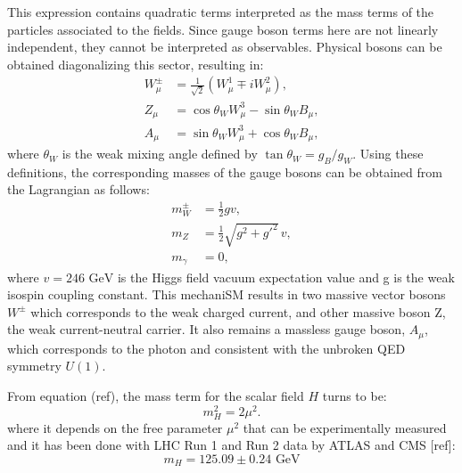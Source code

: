\documentclass[11pt,twoside]{book}
\begin{document}
This expression contains quadratic terms interpreted as the mass terms of the particles associated to the fields. Since gauge boson terms here are not linearly independent, they cannot be interpreted as observables. Physical bosons can be obtained diagonalizing this sector, resulting in:
\begin{align}
W^\pm_\mu &= \frac{1}{\sqrt{2}} \left( W^1_\mu \mp i W^2_\mu \right), \\
Z_\mu &= \cos\theta_W W^3_\mu - \sin\theta_W B_\mu, \\
A_\mu &= \sin\theta_W W^3_\mu + \cos\theta_W B_\mu,
\end{align}
where $\theta_W$ is the weak mixing angle defined by $\tan \theta_W = g_B /g_W$.
Using these definitions, the corresponding masses of the gauge bosons can be obtained from the Lagrangian as follows:
\begin{align}
m^{\pm}_W &= \frac{1}{2} g v, \\
m_Z &= \frac{1}{2} \sqrt{g^2 + g'^2} \, v, \\
m_\gamma &= 0,
\end{align}
where $v = 246 \text{  GeV}$ is the Higgs field vacuum expectation value and g is the weak isospin coupling constant. 
This mechani\acrshort{SM} results in two massive vector bosons $W^{\pm}$ which corresponds to the weak charged current, and other massive boson Z, the weak current-neutral carrier. It also remains a massless gauge boson, $A_{\mu}$, which corresponds to the photon and consistent with the unbroken \acrshort{QED} symmetry $U(1)$.

From equation (ref), the mass term for the scalar field $H$ turns to be:
\begin{equation}
m_H^2 = 2 \mu^2.
\end{equation}
where it depends on the free parameter $\mu^2$ that can be experimentally measured and it has been done with LHC Run 1 and Run 2 data by ATLAS and CMS [ref]:
\begin{equation}
m_H = 125.09 \pm 0.24 \text{ GeV}
\end{equation}
\end{document}

